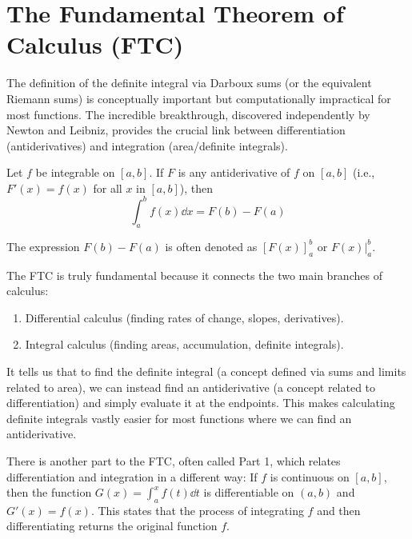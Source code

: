 \section{The Fundamental Theorem of Calculus (FTC)}

The definition of the definite integral via Darboux sums (or the equivalent Riemann sums) is conceptually important but computationally impractical for most functions. The incredible breakthrough, discovered independently by Newton and Leibniz, provides the crucial link between differentiation (antiderivatives) and integration (area/definite integrals).

\begin{theorem}
Let $f$ be integrable on $[a, b]$. If $F$ is any antiderivative of $f$ on $[a, b]$ (i.e., $F'(x) = f(x)$ for all $x$ in $[a, b]$), then
\[ \int_a^b f(x) \dd x = F(b) - F(a) \]
\end{theorem}

\begin{remark}[Notation]
The expression $F(b) - F(a)$ is often denoted as $[F(x)]_a^b$ or $F(x) \big|_a^b$.
\end{remark}

\begin{remark}[Significance]
The FTC is truly fundamental because it connects the two main branches of calculus:
\begin{enumerate}
    \item Differential calculus (finding rates of change, slopes, derivatives).
    \item Integral calculus (finding areas, accumulation, definite integrals).
\end{enumerate}
It tells us that to find the definite integral (a concept defined via sums and limits related to area), we can instead find an antiderivative (a concept related to differentiation) and simply evaluate it at the endpoints. This makes calculating definite integrals vastly easier for most functions where we can find an antiderivative.
\end{remark}

\begin{remark}
There is another part to the FTC, often called Part 1, which relates differentiation and integration in a different way: If $f$ is continuous on $[a, b]$, then the function $G(x) = \int_a^x f(t) \dd t$ is differentiable on $(a, b)$ and $G'(x) = f(x)$. This states that the process of integrating $f$ and then differentiating returns the original function $f$.
\end{remark}

